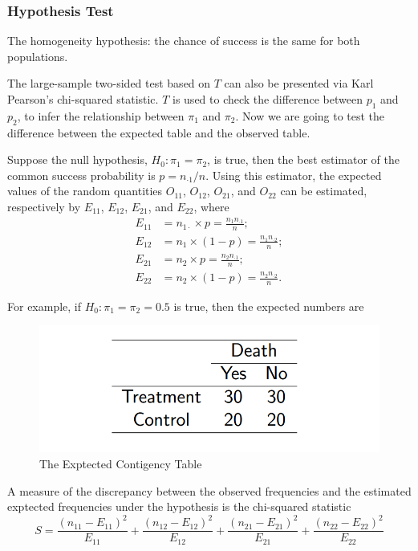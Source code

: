 \subsubsection{Hypothesis Test}
The homogeneity hypothesis: the chance of success is the same for both populations.

The large-sample two-sided test based on $T$ can also be presented via
Karl Pearson's chi-squared statistic. $T$ is used to check the difference between $p_1$ and $p_2$, to infer the relationship between $\pi_1$ and $\pi_2$. Now we are going to test the difference between the expected table and the observed table.

Suppose the null hypothesis, $H_0: \pi_1 = \pi_2$, is true, then the best estimator  of the common success probability is $p = n_{\cdot 1} / n$. Using this estimator, the expected values of the random quantities $O_{11}$, $O_{12}$, $O_{21}$, and $O_{22}$ can be estimated, respectively by $E_{11}$, $E_{12}$, $E_{21}$, and $E_{22}$, where
\begin{align*}
	E_{11} &= n_{1\cdot} \times p = \frac{n_1 n_{\cdot 1}}{n};\\
	E_{12} &= n_1 \times (1 - p) = \frac{n_1 n_{\cdot 2}}{n};\\
	E_{21} &= n_2 \times p = \frac{n_2 n_{\cdot 1}}{n};\\
	E_{22} &= n_2 \times (1 - p) = \frac{n_2 n_{\cdot 2}}{n}.
\end{align*}

For example, if $H_0: \pi_1 = \pi_2 = 0.5$ is true, then the expected numbers are 
\begin{figure}[H]
	\centering
	\includegraphics[width=0.7\linewidth]{fig/expected-table}
	\caption{The Exptected Contigency Table}
	\label{fig:expected-table}
\end{figure}

A measure of the discrepancy between the observed frequencies and the estimated exptected frequencies under the hypothesis is the chi-squared statistic
\[S = \frac{(n_{11} - E_{11})^2}{E_{11}} + \frac{(n_{12} - E_{12})^2}{E_{12}} + \frac{(n_{21} - E_{21})^2}{E_{21}} + \frac{(n_{22} - E_{22})^2}{E_{22}}\]

